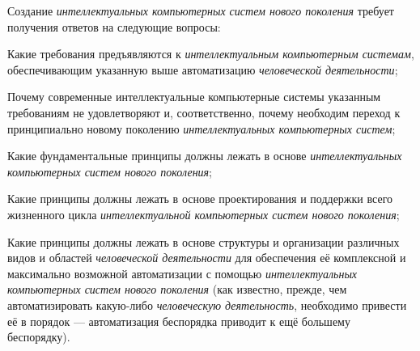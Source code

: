 Создание \textit{интеллектуальных компьютерных систем нового поколения} требует получения ответов на следующие вопросы:
\begin{textitemize}
	\item Какие требования предъявляются к \textit{интеллектуальным компьютерным системам}, обеспечивающим указанную выше  автоматизацию \textit{человеческой деятельности};
	\item Почему современные интеллектуальные компьютерные системы указанным требованиям не удовлетворяют и, соответственно, почему необходим переход к принципиально новому поколению \textit{интеллектуальных компьютерных систем};
	\item Какие фундаментальные принципы должны лежать в основе \textit{интеллектуальных компьютерных систем нового поколения};
	\item Какие принципы должны лежать в основе  проектирования и поддержки всего жизненного цикла \textit{интеллектуальной компьютерных систем нового поколения};
	\item Какие принципы должны лежать в основе структуры и организации различных видов и областей \textit{человеческой деятельности} для обеспечения её комплексной и максимально возможной автоматизации с помощью \textit{интеллектуальных компьютерных систем нового поколения} (как известно, прежде, чем автоматизировать какую-либо \textit{человеческую деятельность}, необходимо привести её в порядок --- автоматизация беспорядка приводит к ещё большему беспорядку).
\end{textitemize}


